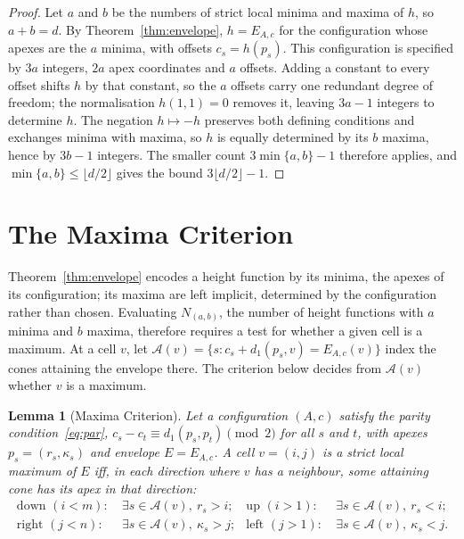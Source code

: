 \documentclass[11pt]{article}
\newtheorem{lemma}[theorem]{Lemma}
\theoremstyle{definition}
\theoremstyle{remark}
\newcommand{\dgrid}{d_1}
\newcommand{\Aset}{\mathcal{A}}
\begin{document}
\begin{proof}
Let $a$ and $b$ be the numbers of strict local minima and maxima of $h$,
so $a+b=d$. By Theorem~\ref{thm:envelope}, $h=E_{A,c}$ for the
configuration whose apexes are the $a$ minima, with offsets $c_s=h(p_s)$.
This configuration is specified by $3a$ integers, $2a$ apex coordinates
and $a$ offsets. Adding a constant to every offset shifts $h$ by that
constant, so the $a$ offsets carry one redundant degree of freedom; the
normalisation $h(1,1)=0$ removes it, leaving $3a-1$ integers to determine
$h$. The negation $h\mapsto-h$ preserves both defining
conditions and exchanges minima with maxima, so $h$ is equally determined
by its $b$ maxima, hence by $3b-1$ integers. The smaller count
$3\min\{a,b\}-1$ therefore applies, and $\min\{a,b\}\le\lfloor d/2\rfloor$
gives the bound $3\lfloor d/2\rfloor-1$.
\end{proof}

\section{The Maxima Criterion}\label{sec:maxima}

Theorem~\ref{thm:envelope} encodes a height function by its minima, the apexes
of its configuration; its maxima are left implicit, determined by the
configuration rather than chosen. Evaluating $N_{(a,b)}$, the number of height
functions with $a$ minima and $b$ maxima, therefore requires a test for whether a
given cell is a maximum. At a
cell $v$, let $\Aset(v)=\{s:c_s+\dgrid(p_s,v)=E_{A,c}(v)\}$ index the cones
attaining the envelope there. The criterion below decides from $\Aset(v)$
whether $v$ is a maximum.

\begin{lemma}[Maxima Criterion]\label{lem:maxima}
Let a configuration $(A,c)$ satisfy the parity condition~\eqref{eq:par},
$c_s-c_t\equiv\dgrid(p_s,p_t)\pmod 2$ for all $s$ and $t$, with apexes
$p_s=(r_s,\kappa_s)$ and envelope $E=E_{A,c}$. A cell $v=(i,j)$ is a strict
local maximum of $E$ iff, in each direction where $v$ has a neighbour, some
attaining cone has its apex in that direction:
\[
\begin{aligned}
\text{down }(i<m):&\ \exists s\in\Aset(v),\ r_s>i; &
\text{up }(i>1):&\ \exists s\in\Aset(v),\ r_s<i;\\
\text{right }(j<n):&\ \exists s\in\Aset(v),\ \kappa_s>j; &
\text{left }(j>1):&\ \exists s\in\Aset(v),\ \kappa_s<j.
\end{aligned}
\]
\end{lemma}
\end{document}
